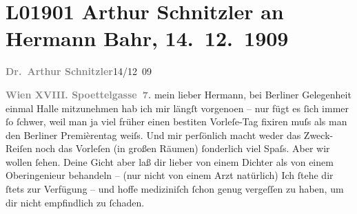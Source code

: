 

\section[Arthur Schnitzler an Hermann Bahr, 14. 12. 1909]{L01901 Arthur Schnitzler an Hermann Bahr, 14. 12. 1909}
\nopagebreak{}
\rehead{ }\normalsize\beginnumbering{}
\toendnotes[C]{\smallbreak\pagebreak[2]}
\toendnotes[C]{\smallbreak}
\pstart
           {\pb}\textcolor{gray}{\textbf{Dr. Arthur Schnitzler}}\hfill 14/12 09\pend
           
\pstart
           \textcolor{gray}{\textbf{Wien XVIII. Spoettelgasse 7.}}\pend
           \vspace{0.5em}
\pstart
           mein lieber Hermann, bei Berliner Gelegenheit einmal Halle
               mitzunehmen hab ich mir längſt vorgeno{\geminationm}en – nur fügt es
               ſich immer ſo ſchwer, weil man ja viel früher einen besti{\geminationm}ten Vorleſe-Tag fixiren muſs als man den Berliner Premièrentag weiſs. Und mir perſönlich macht weder das Zweck-Reiſen
               noch das Vorleſen (in großen Räumen) ſonderlich {\pb}viel Spaſs. Aber wir
               wollen ſehen. Deine Gicht aber laß dir lieber von einem Dichter als von einem Oberingenieur behandeln – (nur
               nicht von einem Arzt natürlich) Ich ſtehe dir ſtets zur Verfügung – und hoffe
               mediziniſch ſchon genug vergeſſen zu haben, um dir nicht empfindlich zu ſchaden.\pend
           
